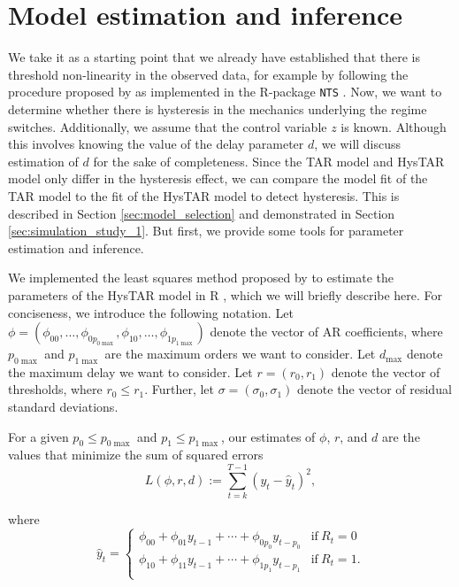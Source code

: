 \documentclass{article}
\begin{document}
\section{Model estimation and inference}
\label{sec:LS_estimation}
We take it as a starting point that we already have established that there is threshold non-linearity in the observed data, for example by following the procedure proposed by \citet{testing_for_threshold_nonlinearity} as implemented in the \textsf{R}-package \texttt{NTS} \citep{R_NTS}. 
Now, we want to determine whether there is hysteresis in the mechanics underlying the regime switches.
Additionally, we assume that the control variable $z$ is known. 
Although this involves knowing the value of the delay parameter $d$, we will discuss estimation of $d$ for the sake of completeness.
Since the TAR model and HysTAR model only differ in the hysteresis effect, we can compare the model fit of the TAR model to the fit of the HysTAR model to detect hysteresis. This is described in Section \ref{sec:model_selection} and demonstrated in Section \ref{sec:simulation_study_1}.
But first, we provide some tools for parameter estimation and inference.

We implemented the least squares method proposed by \citet{bar2} to estimate the parameters of the HysTAR model in \textsf{R} \citep{R, R_hystar}, which we will briefly describe here.
For conciseness, we introduce the following notation.
Let $\phi = (\phi_{00}, \dots, \phi_{0 p_{0\max}}, \phi_{10}, \dots, \phi_{1 p_{1\max}})$ denote the  vector of AR coefficients, where $p_{0\max}$ and $p_{1\max}$ are the maximum orders we want to consider.
Let $d_{\max}$ denote the maximum delay we want to consider.
Let $r = (r_0, r_1)$ denote the vector of thresholds, where $r_0 \le r_1$.
Further, let $\sigma = (\sigma_{0}, \sigma_{1})$ denote the  vector of residual standard deviations.

For a given $p_0 \le p_{0\max}$ and $p_1 \le p_{1\max}$, our estimates of $\phi$, $r$, and $d$ are the values that minimize the sum of squared errors
\begin{equation} \label{eqn:sse}
L(\phi, r, d) := \sum_{t = k}^{T-1} (y_t - \hat{y}_t)^2,
\end{equation}

\noindent where
\begin{equation}
\hat{y}_t = 
\begin{cases}
\phi_{00} + \phi_{01} y_{t-1} + \cdots + \phi_{0 p_0} y_{t-p_0} 
& \text{if}~R_{t} = 0\\
\phi_{10} + \phi_{11} y_{t-1} + \cdots + \phi_{1 p_1} y_{t-p_1} 
& \text{if}~R_{t} = 1. \\
\end{cases}
\end{equation}
\end{document}
